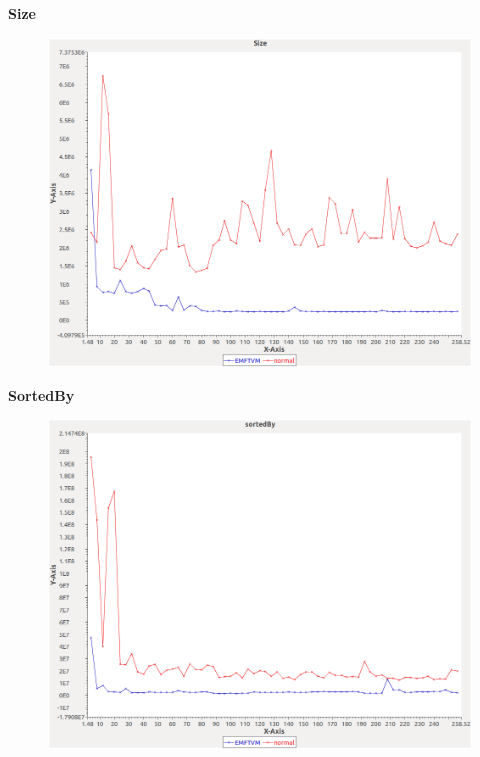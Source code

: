 \noindent\textbf{Size}

\begin{figure}[h]
\centering
\includegraphics[width=\textwidth]{graphs/sequence/Size}
\end{figure}
\pagebreak

\noindent\textbf{SortedBy}

\begin{figure}[h]
\centering
\includegraphics[width=\textwidth]{graphs/sequence/sortedBy}
\end{figure}
\pagebreak

